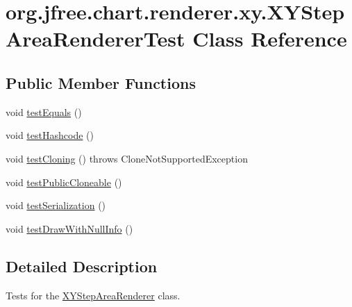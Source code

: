 \hypertarget{classorg_1_1jfree_1_1chart_1_1renderer_1_1xy_1_1_x_y_step_area_renderer_test}{}\section{org.\+jfree.\+chart.\+renderer.\+xy.\+X\+Y\+Step\+Area\+Renderer\+Test Class Reference}
\label{classorg_1_1jfree_1_1chart_1_1renderer_1_1xy_1_1_x_y_step_area_renderer_test}
\subsection*{Public Member Functions}
\begin{DoxyCompactItemize}
\item 
void \mbox{\hyperlink{classorg_1_1jfree_1_1chart_1_1renderer_1_1xy_1_1_x_y_step_area_renderer_test_a13f56e552e0502401ddda7bb87d83e7f}{test\+Equals}} ()
\item 
void \mbox{\hyperlink{classorg_1_1jfree_1_1chart_1_1renderer_1_1xy_1_1_x_y_step_area_renderer_test_a6f1362c6efe446454be7a72926af6e1b}{test\+Hashcode}} ()
\item 
void \mbox{\hyperlink{classorg_1_1jfree_1_1chart_1_1renderer_1_1xy_1_1_x_y_step_area_renderer_test_ac5e549bad4877ca56f4efe7b32d967a1}{test\+Cloning}} ()  throws Clone\+Not\+Supported\+Exception 
\item 
void \mbox{\hyperlink{classorg_1_1jfree_1_1chart_1_1renderer_1_1xy_1_1_x_y_step_area_renderer_test_a7f80db97f0997d73a7d7f2eb861748ce}{test\+Public\+Cloneable}} ()
\item 
void \mbox{\hyperlink{classorg_1_1jfree_1_1chart_1_1renderer_1_1xy_1_1_x_y_step_area_renderer_test_a10091580e083a8ec251ecbdc9fd569b9}{test\+Serialization}} ()
\item 
void \mbox{\hyperlink{classorg_1_1jfree_1_1chart_1_1renderer_1_1xy_1_1_x_y_step_area_renderer_test_a181414c6ab7f212703295b0aa922929b}{test\+Draw\+With\+Null\+Info}} ()
\end{DoxyCompactItemize}


\subsection{Detailed Description}
Tests for the \mbox{\hyperlink{classorg_1_1jfree_1_1chart_1_1renderer_1_1xy_1_1_x_y_step_area_renderer}{X\+Y\+Step\+Area\+Renderer}} class. 


